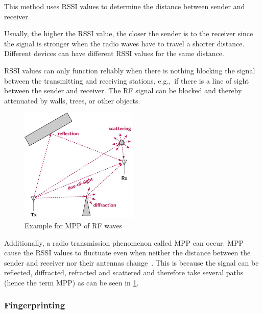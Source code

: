 
This method uses \acf{RSSI} values to determine the distance between sender and receiver.

Usually, the higher the \ac{RSSI} value, the closer the sender is to the receiver since the signal is stronger when the radio waves have to travel a shorter distance.
Different devices can have different \ac{RSSI} values for the same distance.

\ac{RSSI} values can only function reliably when there is nothing blocking the signal between the transmitting and receiving stations, e.g.,\ if there is a line of sight between the sender and receiver.
The \ac{RF} signal can be blocked and thereby attenuated by walls, trees, or other objects.

\begin{figure}
    \centering
    \includegraphics[width=0.5\textwidth]{pictures/diagrams_figures/multipath_propagation.jpg}
    \caption{Example for \acf{MPP} of \ac{RF} waves\protect\cite{milosevic_key_2017}}\label{pic:figure_multipath_propagation}
\end{figure}

Additionally, a radio transmission phenomenon called \acf{MPP} can occur.
\acl{MPP} cause the \ac{RSSI} values to fluctuate even when neither the distance between the sender and receiver nor their antennas change~\cite[p. 136]{abdelfadeel_how_2019}.
This is because the signal can be reflected, diffracted, refracted and scattered and therefore take several paths (hence the term \ac{MPP}) as can be seen in \cref{pic:figure_multipath_propagation}.

\subsubsection{Fingerprinting}

